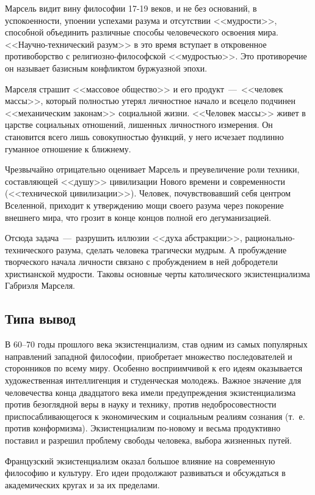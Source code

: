 \documentclass{bmstu}
\begin{document}
Марсель видит вину философии 17-19 веков, и не без оснований, в успокоенности, упоении успехами разума и отсутствии <<мудрости>>, способной объединить различные способы человеческого освоения мира. <<Научно-технический разум>> в это время вступает в откровенное противоборство с религиозно-философской <<мудростью>>. Это противоречие он называет базисным конфликтом буржуазной эпохи.

Марселя страшит <<массовое общество>> и его продукт~---~<<человек массы>>, который полностью утерял личностное начало и всецело подчинен <<механическим законам>> социальной жизни. <<Человек массы>> живет в царстве социальных отношений, лишенных личностного измерения. Он становится всего лишь совокупностью функций, у него исчезает подлинно гуманное отношение к ближнему.

Чрезвычайно отрицательно оценивает Марсель и преувеличение роли техники, составляющей <<душу>> цивилизации Нового времени и современности (<<технической цивилизации>>). Человек, почувствовавший себя центром Вселенной, приходит к утверждению мощи своего разума через покорение внешнего мира, что грозит в конце концов полной его дегуманизацией.

Отсюда задача~---~разрушить иллюзии <<духа абстракции>>, рационально-технического разума, сделать человека трагически мудрым. А пробуждение творческого начала личности связано с пробуждением в ней добродетели христианской мудрости. Таковы основные черты католического экзистенциализма Габриэля Марселя.


\subsection*{Типа вывод}

В 60--70 годы прошлого века экзистенциализм, став одним из самых популярных направлений западной философии, приобретает множество последователей и сторонников по всему миру. Особенно восприимчивой к его идеям оказывается художественная интеллигенция и студенческая молодежь. Важное значение для человечества конца двадцатого века имели предупреждения экзистенциализма против безоглядной веры в науку и технику, против недобросовестности приспосабливающегося к экономическим и социальным реалиям сознания (т.~е. против конформизма). Экзистенциализм по-новому и весьма продуктивно поставил и разрешил проблему свободы человека, выбора жизненных путей.

Французский экзистенциализм оказал большое влияние на современную философию и культуру. Его идеи продолжают развиваться и обсуждаться в академических кругах и за их пределами.
\end{document}
